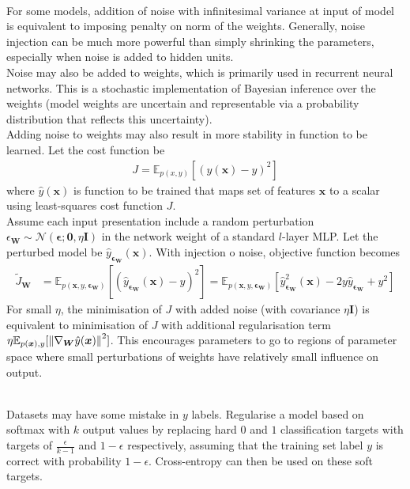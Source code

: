 \begin{remark} \\
For some models, addition of noise with infinitesimal variance at input of model is equivalent to imposing penalty on norm of the weights. Generally, noise injection can be much more powerful than simply shrinking the parameters, especially when noise is added to hidden units.\\
Noise may also be added to weights, which is primarily used in recurrent neural networks. This is a stochastic implementation of Bayesian inference over the weights (model weights are uncertain and representable via a probability distribution that reflects this uncertainty).\\
Adding noise to weights may also result in more stability in function to be learned. Let the cost function be 
\begin{align}
J = \mathbb{E}_{p(x,y)}[(\hat{y}(\bm{x}) - y)^2] \nonumber
\end{align}
where $\hat{y}(\bm{x})$ is function to be trained that maps set of features $\bm{x}$ to a scalar using least-squares cost function $J$.\\
Assume each input presentation include a random perturbation $\epsilon_{\bm{W}} \sim \mathcal{N}(\bm{\epsilon}; \bm{0}, \eta \bm{I})$ in the network weight of a standard $l$-layer MLP. Let the perturbed model be $\hat{y}_{\bm{\epsilon}_{\bm{W}}}(\bm{x})$. With injection o noise, objective function becomes
\begin{align}
\tilde{J}_{\bm{W}} &= \mathbb{E}_{p(\bm{x}, y, \bm{\epsilon}_{\bm{W}})}\left[(\hat{y}_{\bm{\epsilon}_{\bm{W}}}(\bm{x}) - y)^2 \right] = \mathbb{E}_{p(\bm{x}, y, \bm{\epsilon}_{\bm{W}})} \left[\hat{y}^2_{\bm{\epsilon}_{\bm{W}}}(\bm{x}) - 2 y \hat{y}_{\bm{\epsilon}_{\bm{W}}} + y^2 \right] \nonumber
\end{align}
For small $\eta$, the minimisation of $J$ with added noise (with covariance $\eta \bm{I}$) is equivalent to minimisation of $J$ with additional regularisation term $\eta \mathbb{E}_{p(\bm{x}), y} [\left\lVert\nabla_{\bm{W}} \hat{y}(\bm{x})\right\rVert^2]$. This encourages parameters to go to regions of parameter space where small perturbations of weights have relatively small influence on output.
\end{remark}

\begin{remark} \\
Datasets may have some mistake in $y$ labels. Regularise a model based on softmax with $k$ output values by replacing hard $0$ and $1$ classification targets with targets of $\frac{\epsilon}{k-1}$ and $1-\epsilon$ respectively, assuming that the training set label $y$ is correct with probability $1- \epsilon$. Cross-entropy can then be used on these soft targets.
\end{remark}

